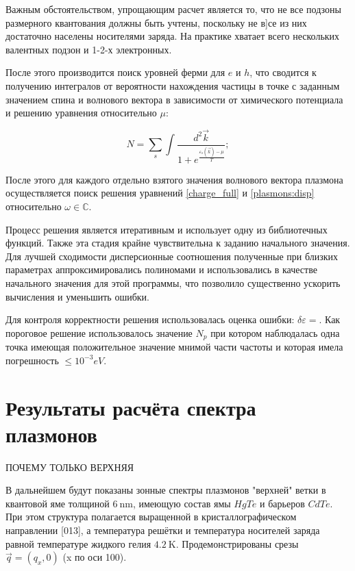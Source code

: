 \documentclass[../main.tex]{subfiles}
\begin{document}

    Важным обстоятельством, упрощающим расчет является то, что не все подзоны размерного 
    квантования должны быть учтены, поскольку не в]се из них достаточно населены 
    носителями заряда. На практике хватает всего нескольких валентных подзон и 1-2-х 
    электронных. 


    После этого производится поиск уровней ферми для $e$ и $h$, что сводится к получению
    интегралов от вероятности нахождения частицы в точке с заданным значением спина
    и волнового вектора в зависимости от химического потенциала и решению 
    уравнения относительно $\mu$:

    \begin{equation}
        N = \sum_s \int \frac{d^2 \vec k}{1 + e^\frac{\varepsilon_s(\vec k) - \mu}{T}};
    \end{equation}

    После этого для каждого отдельно взятого значения волнового вектора плазмона 
    осуществляется поиск решения уравнений \ref{charge_full} и \ref{plasmons:disp}
    относительно $\omega \in \mathbb{C}$.

    Процесс решения является итеративным и использует одну из библиотечных функций.
    Также эта стадия крайне чувствительна к заданию начального значения. Для лучшей 
    сходимости дисперсионные соотношения полученные при близких параметрах 
    аппроксимировались полиномами и использовались в качестве начального значения для
    этой программы, что позволило существенно ускорить вычисления и уменьшить ошибки.


    Для контроля корректности решения использовалась оценка ошибки:
    $\delta \varepsilon = $. 
    Как пороговое решение использовалось значение $N_p$ при котором наблюдалась 
    одна точка имеющая положительное значение мнимой части частоты и которая 
    имела погрешность $\leq 10^{-3} eV$.


    \section{Результаты расчёта спектра плазмонов}

ПОЧЕМУ ТОЛЬКО ВЕРХНЯЯ

    В дальнейшем будут показаны зонные спектры плазмонов "верхней" ветки в 
    квантовой яме толщиной $6~\text{nm}$, имеющую состав ямы $HgTe$ и 
    барьеров $CdTe$. При этом структура полагается выращенной в кристаллографическом
    направлении [013], а температура решётки и температура носителей заряда равной 
    температуре жидкого гелия $4.2~\text{K}$. Продемонстрированы срезы 
    $\vec q = (q_x, 0)$ (x по оси 100).
\end{document}
